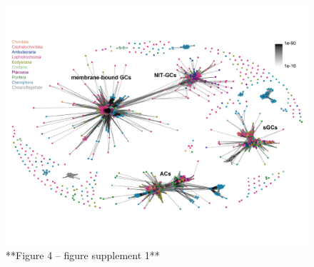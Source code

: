 \documentclass[
  10pt,
  onecolumn]{article}
\begin{document}
\begin{figure}
\includegraphics[width=33.33in]{figures/Fig4_sup1} \caption{**Figure 4 -- figure supplement 1** }\label{fig:unnamed-chunk-12}
\end{figure}
\end{document}
